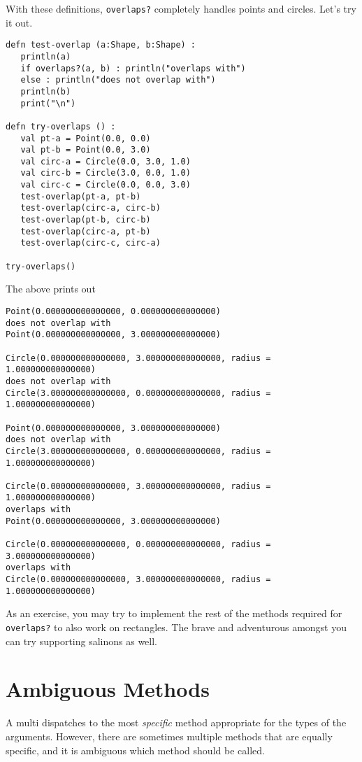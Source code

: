 \documentclass[10pt,oneside]{book}
\begin{document}
With these definitions, \texttt{\frenchspacing overlaps?} completely handles points and circles. Let's try it out.
\begin{lstlisting}
defn test-overlap (a:Shape, b:Shape) :
   println(a)
   if overlaps?(a, b) : println("overlaps with")
   else : println("does not overlap with")
   println(b)
   print("\n")
   
defn try-overlaps () :
   val pt-a = Point(0.0, 0.0)
   val pt-b = Point(0.0, 3.0)
   val circ-a = Circle(0.0, 3.0, 1.0)
   val circ-b = Circle(3.0, 0.0, 1.0)
   val circ-c = Circle(0.0, 0.0, 3.0)
   test-overlap(pt-a, pt-b)
   test-overlap(circ-a, circ-b)
   test-overlap(pt-b, circ-b)
   test-overlap(circ-a, pt-b)
   test-overlap(circ-c, circ-a)

try-overlaps()
\end{lstlisting}
The above prints out
\begin{lstlisting}
Point(0.000000000000000, 0.000000000000000)
does not overlap with
Point(0.000000000000000, 3.000000000000000)

Circle(0.000000000000000, 3.000000000000000, radius = 1.000000000000000)
does not overlap with
Circle(3.000000000000000, 0.000000000000000, radius = 1.000000000000000)

Point(0.000000000000000, 3.000000000000000)
does not overlap with
Circle(3.000000000000000, 0.000000000000000, radius = 1.000000000000000)

Circle(0.000000000000000, 3.000000000000000, radius = 1.000000000000000)
overlaps with
Point(0.000000000000000, 3.000000000000000)

Circle(0.000000000000000, 0.000000000000000, radius = 3.000000000000000)
overlaps with
Circle(0.000000000000000, 3.000000000000000, radius = 1.000000000000000)
\end{lstlisting}

As an exercise, you may try to implement the rest of the methods required for \texttt{\frenchspacing overlaps?} to also work on rectangles. The brave and adventurous amongst you can try supporting salinons as well.

\section{Ambiguous Methods}
A multi dispatches to the most {\em specific} method appropriate for the types of the arguments. However, there are sometimes multiple methods that are equally specific, and it is ambiguous which method should be called. 
\end{document}

